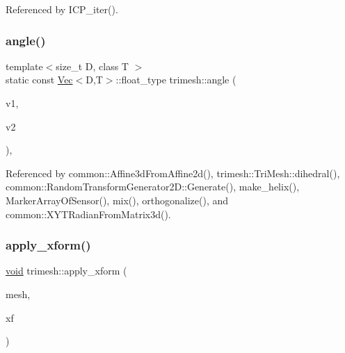Referenced by I\+C\+P\+\_\+iter().

\mbox{\label{namespacetrimesh_acba06a73033388814bcced624f9bf561}} 
\subsubsection{\texorpdfstring{angle()}{angle()}}
{\footnotesize\ttfamily template$<$size\+\_\+t D, class T $>$ \\
static const \hyperlink{classtrimesh_1_1Vec}{Vec}$<$D,T$>$\+::float\+\_\+type trimesh\+::angle (\begin{DoxyParamCaption}\item[{const \hyperlink{classtrimesh_1_1Vec}{Vec}$<$ D, T $>$ \&}]{v1,  }\item[{const \hyperlink{classtrimesh_1_1Vec}{Vec}$<$ D, T $>$ \&}]{v2 }\end{DoxyParamCaption})\hspace{0.3cm}{\ttfamily [inline]}, {\ttfamily [static]}}



Referenced by common\+::\+Affine3d\+From\+Affine2d(), trimesh\+::\+Tri\+Mesh\+::dihedral(), common\+::\+Random\+Transform\+Generator2\+D\+::\+Generate(), make\+\_\+helix(), Marker\+Array\+Of\+Sensor(), mix(), orthogonalize(), and common\+::\+X\+Y\+T\+Radian\+From\+Matrix3d().

\mbox{\label{namespacetrimesh_a64437f39a2aa06bf645b8433091a65f2}} 
\subsubsection{\texorpdfstring{apply\+\_\+xform()}{apply\_xform()}}
{\footnotesize\ttfamily \hyperlink{namespacetrimesh_a784ddfd979e1c579bda795a8edfc3f43}{void} trimesh\+::apply\+\_\+xform (\begin{DoxyParamCaption}\item[{\hyperlink{classtrimesh_1_1TriMesh}{Tri\+Mesh} $\ast$}]{mesh,  }\item[{const \hyperlink{namespacetrimesh_ad504958f2f56e393991b848986a8459f}{xform} \&}]{xf }\end{DoxyParamCaption})}



